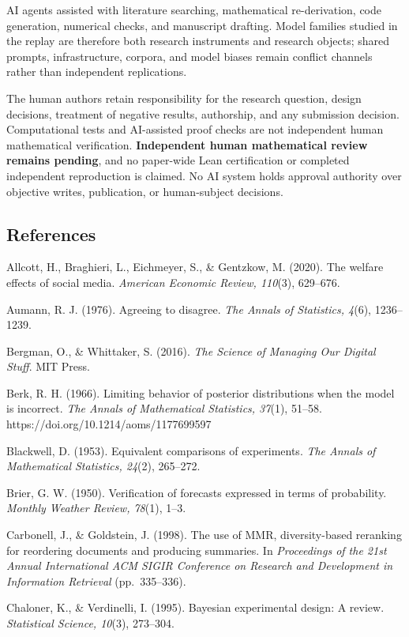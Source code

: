 \documentclass[
  11pt]{article}
\begin{document}
AI agents assisted with literature searching, mathematical
re-derivation, code generation, numerical checks, and manuscript
drafting. Model families studied in the replay are therefore both
research instruments and research objects; shared prompts,
infrastructure, corpora, and model biases remain conflict channels
rather than independent replications.

The human authors retain responsibility for the research question,
design decisions, treatment of negative results, authorship, and any
submission decision. Computational tests and AI-assisted proof checks
are not independent human mathematical verification. \textbf{Independent
human mathematical review remains pending}, and no paper-wide Lean
certification or completed independent reproduction is claimed. No AI
system holds approval authority over objective writes, publication, or
human-subject decisions.

\subsection{References}\label{references}

Allcott, H., Braghieri, L., Eichmeyer, S., \& Gentzkow, M. (2020). The
welfare effects of social media. \emph{American Economic Review,
110}(3), 629--676.

Aumann, R. J. (1976). Agreeing to disagree. \emph{The Annals of
Statistics, 4}(6), 1236--1239.

Bergman, O., \& Whittaker, S. (2016). \emph{The Science of Managing Our
Digital Stuff}. MIT Press.

Berk, R. H. (1966). Limiting behavior of posterior distributions when
the model is incorrect. \emph{The Annals of Mathematical Statistics,
37}(1), 51--58. https://doi.org/10.1214/aoms/1177699597

Blackwell, D. (1953). Equivalent comparisons of experiments. \emph{The
Annals of Mathematical Statistics, 24}(2), 265--272.

Brier, G. W. (1950). Verification of forecasts expressed in terms of
probability. \emph{Monthly Weather Review, 78}(1), 1--3.

Carbonell, J., \& Goldstein, J. (1998). The use of MMR, diversity-based
reranking for reordering documents and producing summaries. In
\emph{Proceedings of the 21st Annual International ACM SIGIR Conference
on Research and Development in Information Retrieval} (pp.~335--336).

Chaloner, K., \& Verdinelli, I. (1995). Bayesian experimental design: A
review. \emph{Statistical Science, 10}(3), 273--304.
\end{document}
